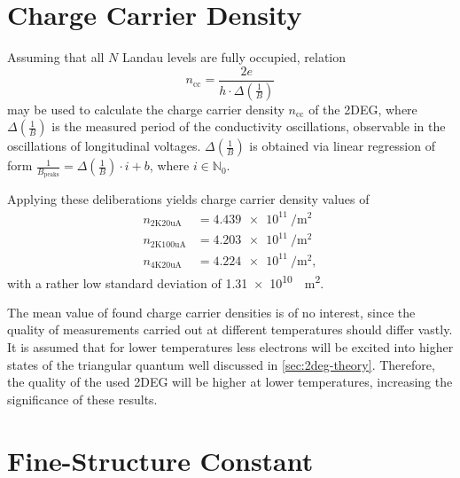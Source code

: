 \section{Charge Carrier Density} %
Assuming that all $N$ Landau levels are fully occupied, relation
\begin{equation*}
	n_\text{cc} = \frac{2e}{h\cdot\Delta\left(\frac{1}{B}\right)}
\end{equation*}
may be used to calculate the charge carrier density $n_\text{cc}$ of the 2DEG, where $\Delta\left(\frac{1}{B}\right)$ is the measured period of the conductivity oscillations, observable in the oscillations of longitudinal voltages.
$\Delta\left(\frac{1}{B}\right)$ is obtained via linear regression of form $\frac{1}{B_\text{peaks}} = \Delta\left(\frac{1}{B}\right)\cdot i + b$, where $i\in\mathbb{N}_0$.

Applying these deliberations yields charge carrier density values of
\begin{align*}
	n_\text{2K20uA} &= \SI{4.439e11}{\per\meter\squared} \\
	n_\text{2K100uA} &= \SI{4.203e11}{\per\meter\squared} \\
	n_\text{4K20uA} &= \SI{4.224e11}{\per\meter\squared},
\end{align*}
with a rather low standard deviation of \SI{1.31e10}{\per\meter\squared}.

The mean value of found charge carrier densities is of no interest, since the quality of measurements carried out at different temperatures should differ vastly.
It is assumed that for lower temperatures less electrons will be excited into higher states of the triangular quantum well discussed in \autoref{sec:2deg-theory}.
Therefore, the quality of the used 2DEG will be higher at lower temperatures, increasing the significance of these results.

\section{Fine-Structure Constant} %
